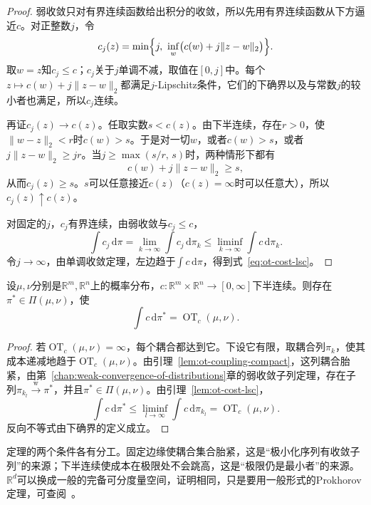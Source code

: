 \begin{proof}
弱收敛只对有界连续函数给出积分的收敛，所以先用有界连续函数从下方逼近$c$。对正整数$j$，令
\[
 c_j(z)=\min\Bigl\{j,\ \inf_{w}\bigl(c(w)+j\lVert z-w\rVert_2\bigr)\Bigr\}.
\]
取$w=z$知$c_j\leq c$；$c_j$关于$j$单调不减，取值在$[0,j]$中。每个$z\mapsto c(w)+j\lVert z-w\rVert_2$都满足$j$-Lipschitz条件，它们的下确界以及与常数$j$的较小者也满足，所以$c_j$连续。

再证$c_j(z)\to c(z)$。任取实数$s<c(z)$。由下半连续，存在$r>0$，使$\lVert w-z\rVert_2<r$时$c(w)>s$。于是对一切$w$，或者$c(w)>s$，或者$j\lVert z-w\rVert_2\geq jr$。当$j\geq\max(s/r,\,s)$时，两种情形下都有
\[
 c(w)+j\lVert z-w\rVert_2\geq s ,
\]
从而$c_j(z)\geq s$。$s$可以任意接近$c(z)$（$c(z)=\infty$时可以任意大），所以$c_j(z)\uparrow c(z)$。

对固定的$j$，$c_j$有界连续，由弱收敛与$c_j\leq c$，
\[
 \int c_j\,\mathrm{d}\pi=\lim_{k\to\infty}\int c_j\,\mathrm{d}\pi_k\leq\liminf_{k\to\infty}\int c\,\mathrm{d}\pi_k .
\]
令$j\to\infty$，由单调收敛定理，左边趋于$\int c\,\mathrm{d}\pi$，得到式~\eqref{eq:ot-cost-lsc}。
\end{proof}

\begin{theorem}[最优耦合的存在]
\label{thm:ot-existence}
设$\mu,\nu$分别是$\mathbb{R}^{m},\mathbb{R}^{n}$上的概率分布，$c:\mathbb{R}^{m}\times\mathbb{R}^{n}\to[0,\infty]$下半连续。则存在$\pi^{*}\in\Pi(\mu,\nu)$，使
\begin{equation}
 \int c\,\mathrm{d}\pi^{*}=\operatorname{OT}_c(\mu,\nu).
 \label{eq:ot-existence}
\end{equation}
\end{theorem}

\begin{proof}
若$\operatorname{OT}_c(\mu,\nu)=\infty$，每个耦合都达到它。下设它有限，取耦合列$\pi_k$，使其成本递减地趋于$\operatorname{OT}_c(\mu,\nu)$。由引理~\ref{lem:ot-coupling-compact}，这列耦合胎紧，由第~\ref{chap:weak-convergence-of-distributions}章的弱收敛子列定理，存在子列$\pi_{k_l}\xrightarrow{\mathrm{w}}\pi^{*}$，并且$\pi^{*}\in\Pi(\mu,\nu)$。由引理~\ref{lem:ot-cost-lsc}，
\[
 \int c\,\mathrm{d}\pi^{*}\leq\liminf_{l\to\infty}\int c\,\mathrm{d}\pi_{k_l}=\operatorname{OT}_c(\mu,\nu).
\]
反向不等式由下确界的定义成立。
\end{proof}

定理的两个条件各有分工。固定边缘使耦合集合胎紧，这是“极小化序列有收敛子列”的来源；下半连续使成本在极限处不会跳高，这是“极限仍是最小者”的来源。$\mathbb{R}^{d}$可以换成一般的完备可分度量空间，证明相同，只是要用一般形式的Prokhorov定理，可查阅~。

